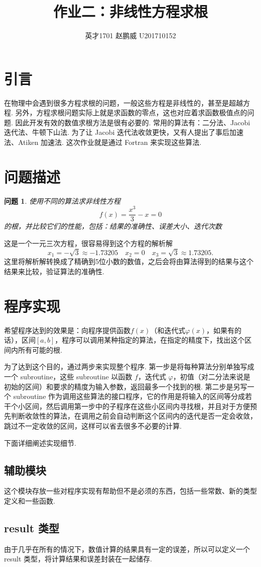 \documentclass{article}
\title{作业二：非线性方程求根}
\author{英才1701 赵鹏威 U201710152}
\newtheorem{task}{问题}
\begin{document}
	\maketitle
	\tableofcontents
	\newpage
	\section{引言}
	在物理中会遇到很多方程求根的问题，一般这些方程是非线性的，甚至是超越方程. 另外，方程求根问题实际上就是求函数的零点，这也对应着求函数极值点的问题. 因此开发有效的数值求根方法是很有必要的. 常用的算法有：二分法、Jacobi 迭代法、牛顿下山法. 为了让 Jacobi 迭代法收敛更快，又有人提出了事后加速法、Atiken 加速法. 这次作业就是通过 Fortran 来实现这些算法. 
	
	\section{问题描述}
	\begin{task}
		使用不同的算法求非线性方程
		\[
		f(x)=\frac{x^3}{3}-x=0
		\]
		的根，并比较它们的性能，包括：结果的准确性、误差大小、迭代次数
	\end{task}
	
	这是一个一元三次方程，很容易得到这个方程的解析解
	\[
	x_1 = -\sqrt{3}\approx-1.73205 \quad x_2 = 0 \quad x_3=\sqrt{3}\approx1.73205.
	\]
	这里将解析解转换成了精确到5位小数的数值，之后会将由算法得到的结果与这个结果来比较，验证算法的准确性.
	
	\section{程序实现}
	希望程序达到的效果是：向程序提供函数$f(x)$（和迭代式$\varphi(x)$，如果有的话），区间$[a, b]$，程序可以调用某种指定的算法，在指定的精度下，找出这个区间内所有可能的根. 
	
	为了达到这个目的，通过两步来实现整个程序. 第一步是将每种算法分别单独写成一个 subroutine，这些 subroutine 以函数 $f$，迭代式 $\varphi$，初值（对二分法来说是初始的区间）和要求的精度为输入参数，返回最多一个找到的根. 第二步是另写一个 subroutine 作为调用这些算法的接口程序，它的作用是将输入的区间等分成若干个小区间，然后调用第一步中的子程序在这些小区间内寻找根，并且对于方便预先判断收敛性的算法，在调用之前会自动判断这个区间内的迭代是否一定会收敛，跳过不一定收敛的区间，这样可以省去很多不必要的计算.
	
	下面详细阐述实现细节.
	
	\subsection{辅助模块}
	这个模块存放一些对程序实现有帮助但不是必须的东西，包括一些常数、新的类型定义和一些函数.
	\subsection{result 类型}
	由于几乎在所有的情况下，数值计算的结果具有一定的误差，所以可以定义一个 result 类型，将计算结果和误差封装在一起储存.
	
	
\end{document}
